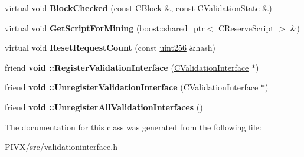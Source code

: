 \begin{DoxyCompactItemize}
virtual void {\bfseries Block\+Checked} (const \mbox{\hyperlink{class_c_block}{C\+Block}} \&, const \mbox{\hyperlink{class_c_validation_state}{C\+Validation\+State}} \&)
\item 
\mbox{\label{class_c_validation_interface_a0aa027d3fd8689cbc849e558965d0c6d}} 
virtual void {\bfseries Get\+Script\+For\+Mining} (boost\+::shared\+\_\+ptr$<$ C\+Reserve\+Script $>$ \&)
\item 
\mbox{\label{class_c_validation_interface_aef71b9e7286b9344730e654e836a2ccd}} 
virtual void {\bfseries Reset\+Request\+Count} (const \mbox{\hyperlink{classuint256}{uint256}} \&hash)
\item 
\mbox{\label{class_c_validation_interface_aa7a5e52b8950b16b3c14391809047ca6}} 
friend {\bfseries void \+::\+Register\+Validation\+Interface} (\mbox{\hyperlink{class_c_validation_interface}{C\+Validation\+Interface}} $\ast$)
\item 
\mbox{\label{class_c_validation_interface_aaed3b260b3de64ed423a9a24bf0e29f4}} 
friend {\bfseries void \+::\+Unregister\+Validation\+Interface} (\mbox{\hyperlink{class_c_validation_interface}{C\+Validation\+Interface}} $\ast$)
\item 
\mbox{\label{class_c_validation_interface_a7234df2b6e1a079260489eea6eb6eb72}} 
friend {\bfseries void \+::\+Unregister\+All\+Validation\+Interfaces} ()
\end{DoxyCompactItemize}


The documentation for this class was generated from the following file\+:\begin{DoxyCompactItemize}
\item 
P\+I\+V\+X/src/validationinterface.\+h\end{DoxyCompactItemize}
